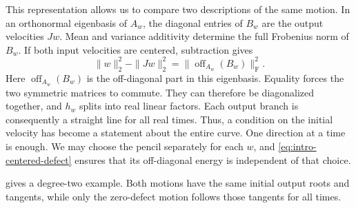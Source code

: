\documentclass[12pt,reqno]{amsart}
\theoremstyle{definition}
\theoremstyle{remark}
\begin{document}
This representation allows us to compare two descriptions of the same
motion. In an orthonormal eigenbasis of \(A_w\), the diagonal entries of
\(B_w\) are the output velocities \(Jw\). Mean and variance additivity
determine the full Frobenius norm of \(B_w\).  If both input velocities
are centered, subtraction gives
\begin{equation}\label{eq:intro-centered-defect}
 \|w\|_2^2-\|Jw\|_2^2
     =\|\operatorname{off}_{A_w}(B_w)\|_{\mathrm F}^2.
\end{equation}
Here \(\operatorname{off}_{A_w}(B_w)\) is the off-diagonal part in
this eigenbasis. Equality forces the two symmetric matrices to
commute. They can therefore be diagonalized together, and \(h_w\)
splits into real linear factors. Each output branch is consequently
a straight line for all real times. Thus, a condition on the initial
velocity has become a statement about the entire curve. One direction at a time is enough. We may choose the pencil separately for each \(w\), and
\eqref{eq:intro-centered-defect} ensures that its off-diagonal
energy is independent of that choice.

 gives a degree-two example.
Both motions have the same initial output roots and tangents, while only the zero-defect motion follows those tangents for all times.
\end{document}
